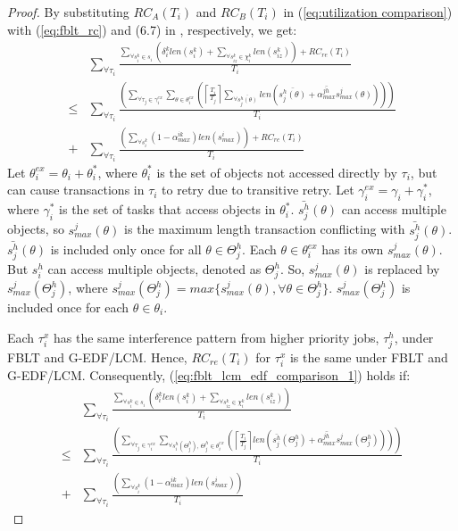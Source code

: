\documentclass[prodmode,acmtecs]{acmsmall}
\begin{document}
\begin{proof}
By substituting $RC_{A}(T_{i})$ and $RC_{B}(T_{i})$ in (\ref{eq:utilization comparison})
with (\ref{eq:fblt_rc}) and (6.7) in \cite{shambake_phd_proposal}, respectively, we get:
\begin{eqnarray}
 & \sum_{\forall\tau_{i}}\frac{\sum_{\forall s_{i}^{k}\in s_{i}}\left(\delta_i^klen(s_{i}^{k})+\sum_{\forall s_{iz}^{k}\in\chi_{i}^{k}}len(s_{iz}^{k})\right)+RC_{re}(T_{i})}{T_{i}}\label{eq:fblt_lcm_edf_comparison_1}\\
\le & \sum_{\forall\tau_{i}}\frac{\left(\sum_{\forall\tau_{j}\in\gamma_{i}^{ex}}\sum_{\theta\in\theta_{i}^{ex}}\left(\left\lceil \frac{T_{i}}{T_{j}}\right\rceil \sum_{\forall\bar{s_{j}^{h}(\theta)}}len\left(\bar{s_{j}^{h}(\theta)}+\bar{\alpha_{max}^{jh}}s_{max}^{j}(\theta)\right)\right)\right)}{T_{i}}\nonumber \\
+ & \sum_{\forall\tau_{i}}\frac{\left(\sum_{\forall s_{i}^{k}}\left(1-\alpha_{max}^{ik}\right)len\left(s_{max}^{i}\right)\right)+RC_{re}(T_{i})}{T_{i}}\nonumber 
\end{eqnarray}
%
Let $\theta_{i}^{ex}=\theta_{i}+\theta_{i}^{*}$, where $\theta_{i}^{*}$
is the set of objects not accessed directly by $\tau_{i}$, but can
cause transactions in $\tau_{i}$ to retry due to transitive retry.
Let $\gamma_{i}^{ex}=\gamma_{i}+\gamma_{i}^{*}$, where $\gamma_{i}^{*}$
is the set of tasks that access objects in $\theta_{i}^{*}$. $\bar{s_{j}^{h}}(\theta)$
can access multiple objects, so $s_{max}^{j}(\theta)$ is the maximum
length transaction conflicting with $\bar{s_{j}^{h}}(\theta)$. $\bar{s_{j}^{h}}(\theta)$ is included only once for all $\theta \in \Theta_j^h$. Each $\theta \in \theta_i^{ex}$ has its own $s_{max}^j(\theta)$. But $s_i^h$ can access multiple objects, denoted as $\Theta_j^h$. So, $s_{max}^j(\theta)$ is replaced by $s_{max}^j(\Theta_j^h)$, where $s_{max}^j(\Theta_j^h)=max\{s_{max}^j(\theta),\forall \theta \in \Theta_j^h\}$. 
 $s_{max}^j(\Theta_j^h)$ is included once for each $\theta \in \theta_i$. 
 
 
 Each $\tau_i^x$ has the same interference pattern from higher priority jobs, $\tau_j^h$, under FBLT and G-EDF/LCM. Hence, $RC_{re}(T_i)$ for $\tau_i^x$ is the same under FBLT and G-EDF/LCM. Consequently, (\ref{eq:fblt_lcm_edf_comparison_1}) holds if:
\begin{eqnarray}
 & \sum_{\forall\tau_{i}}\frac{\sum_{\forall s_{i}^{k}\in s_{i}}\left(\delta_i^klen(s_{i}^{k})+\sum_{\forall s_{iz}^{k}\in\chi_{i}^{k}}len(s_{iz}^{k})\right)}{T_{i}}\label{eq:fblt_lcm_edf_comparison_2}\\
\le & \sum_{\forall\tau_{i}}\frac{\left(\sum_{\forall\tau_{j}\in\gamma_{i}^{ex}}\sum_{\forall s_i^h(\Theta_j^h),\,\Theta_j^h\in
\theta_{i}^{ex}}\left(\left\lceil \frac{T_{i}}{T_{j}}\right\rceil len\left(\bar{s_{j}^{h}}(\Theta_j^h)+\bar{\alpha_{max}^{jh}}s_{max}^{j}(\Theta_j^h)\right)\right)\right)}{T_{i}}\nonumber \\
+ & \sum_{\forall\tau_{i}}\frac{\left(\sum_{\forall s_{i}^{k}}\left(1-\alpha_{max}^{ik}\right)len\left(s_{max}^{i}\right)\right)}{T_{i}}\nonumber 
\end{eqnarray}


\end{proof}
\end{document}
